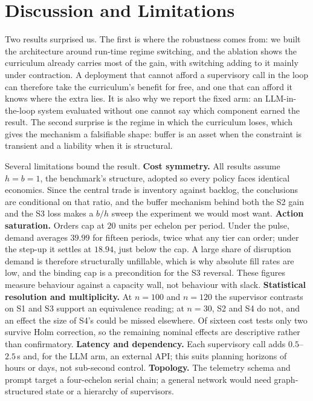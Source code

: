 \documentclass[conference]{IEEEtran}
\begin{document}
\section{Discussion and Limitations}

Two results surprised us. The first is where the robustness comes from: we
built the architecture around run-time regime switching, and the ablation
shows the curriculum already carries most of the gain, with switching adding
to it mainly under contraction. A deployment that cannot afford a
supervisory call in the loop can therefore take the curriculum's benefit for
free, and one that can afford it knows where the extra lies. It is also why
we report the fixed arm: an LLM-in-the-loop system evaluated without one
cannot say which component earned the result. The second surprise is the
regime in which the curriculum loses, which gives the mechanism a
falsifiable shape: buffer is an asset when the constraint is transient and
a liability when it is structural.

Several limitations bound the result.
\textbf{Cost symmetry.} All results assume $h = b = 1$, the benchmark's
structure, adopted so every policy faces identical economics. Since the
central trade is inventory against backlog, the conclusions are conditional
on that ratio, and the buffer mechanism behind both the S2 gain and the S3
loss makes a $b/h$ sweep the experiment we would most want.
\textbf{Action saturation.} Orders cap at $20$ units per echelon per period.
Under the pulse, demand averages $39.99$ for fifteen periods, twice what any
tier can order; under the step-up it settles at $18.94$, just below the cap.
A large share of disruption demand is therefore structurally unfillable,
which is why absolute fill rates are low, and the binding cap is a
precondition for the S3 reversal. These figures measure behaviour against a
capacity wall, not behaviour with slack.
\textbf{Statistical resolution and multiplicity.} At $n=100$ and $n=120$ the
supervisor contrasts on S1 and S3 support an equivalence reading; at $n=30$,
S2 and S4 do not, and an effect the size of S4's could be missed elsewhere.
Of sixteen cost tests only two survive Holm correction, so the remaining
nominal effects are descriptive rather than confirmatory.
\textbf{Latency and dependency.} Each supervisory call adds
$0.5$--$2.5$\,s and, for the LLM arm, an external API; this suits planning
horizons of hours or days, not sub-second control.
\textbf{Topology.} The telemetry schema and prompt target a four-echelon
serial chain; a general network would need graph-structured state or a
hierarchy of supervisors.
\end{document}
